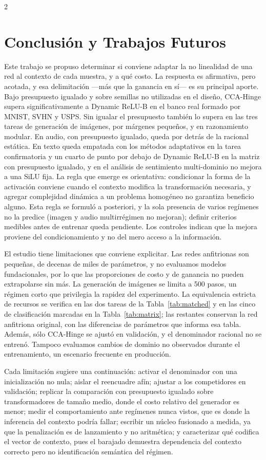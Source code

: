 \begin{multicols}{2}
\section{Conclusión y Trabajos Futuros}

Este trabajo se propuso determinar si conviene adaptar la no linealidad de una red al contexto de cada muestra, y a qué costo. La respuesta es afirmativa, pero acotada, y esa delimitación —más que la ganancia en sí— es su principal aporte. Bajo presupuesto igualado y sobre semillas no utilizadas en el diseño, CCA-Hinge supera significativamente a Dynamic ReLU-B en el banco real formado por MNIST, SVHN y USPS. Sin igualar el presupuesto también lo supera en las tres tareas de generación de imágenes, por márgenes pequeños, y en razonamiento modular. En audio, con presupuesto igualado, queda por detrás de la racional estática. En texto queda empatada con los métodos adaptativos en la tarea confirmatoria y un cuarto de punto por debajo de Dynamic ReLU-B en la matriz con presupuesto igualado, y en el análisis de sentimiento multi-dominio no mejora a una SiLU fija. La regla que emerge es orientativa: condicionar la forma de la activación conviene cuando el contexto modifica la transformación necesaria, y agregar complejidad dinámica a un problema homogéneo no garantiza beneficio alguno. Esta regla se formuló a posteriori, y la sola presencia de varios regímenes no la predice (imagen y audio multirrégimen no mejoran); definir criterios medibles antes de entrenar queda pendiente. Los controles indican que la mejora proviene del condicionamiento y no del mero acceso a la información.

El estudio tiene limitaciones que conviene explicitar. Las redes anfitrionas son pequeñas, de decenas de miles de parámetros, y no evaluamos modelos fundacionales, por lo que las proporciones de costo y de ganancia no pueden extrapolarse sin más. La generación de imágenes se limita a 500 pasos, un régimen corto que privilegia la rapidez del experimento. La equivalencia estricta de recursos se verifica en las dos tareas de la Tabla~\ref{tab:matched} y en las cinco de clasificación marcadas en la Tabla~\ref{tab:matrix}; las restantes conservan la red anfitriona original, con las diferencias de parámetros que informa esa tabla. Además, sólo CCA-Hinge se ajustó en validación, y el denominador racional no se entrenó. Tampoco evaluamos cambios de dominio no observados durante el entrenamiento, un escenario frecuente en producción.

Cada limitación sugiere una continuación: activar el denominador con una inicialización no nula; aislar el reencuadre afín; ajustar a los competidores en validación; replicar la comparación con presupuesto igualado sobre transformadores de tamaño medio, donde el costo relativo del generador es menor; medir el comportamiento ante regímenes nunca vistos, que es donde la inferencia del contexto podría fallar; escribir un núcleo fusionado a medida, ya que la penalización es de lanzamiento y no aritmética; y caracterizar qué codifica el vector de contexto, pues el barajado demuestra dependencia del contexto correcto pero no identificación semántica del régimen.


\end{multicols}
